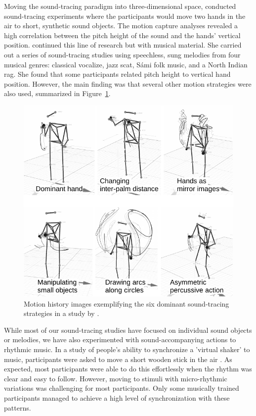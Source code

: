 Moving the sound-tracing paradigm into three-dimensional space, \citet{nymoen_methods_2013} conducted sound-tracing experiments where the participants would move two hands in the air to short, synthetic sound objects. The motion capture analyses revealed a high correlation between the pitch height of the sound and the hands' vertical position. \citet{kelkar_computational_2019} continued this line of research but with musical material. She carried out a series of sound-tracing studies using speechless, sung melodies from four musical genres: classical vocalize, jazz scat, Sámi folk music, and a North Indian rag. She found that some participants related pitch height to vertical hand position. However, the main finding was that several other motion strategies were also used, summarized in Figure~\ref{fig:sound-tracings-kelkar}.

\begin{figure}[tbp]
      \centering
      \includegraphics[width=\columnwidth]{figures/30-sound-tracing2-crop.pdf}
      \caption{Motion history images exemplifying the six dominant sound-tracing strategies in a study by \citet{kelkar_analyzing_2018}.}
      \label{fig:sound-tracings-kelkar}
\end{figure}

While most of our sound-tracing studies have focused on individual sound objects or melodies, we have also experimented with sound-accompanying actions to rhythmic music. In a study of people's ability to synchronize a 'virtual shaker' to music, participants were asked to move a short wooden stick in the air \citep{danielsen_moving_2015}. As expected, most participants were able to do this effortlessly when the rhythm was clear and easy to follow. However, moving to stimuli with micro-rhythmic variations was challenging for most participants. Only some musically trained participants managed to achieve a high level of synchronization with these patterns.

